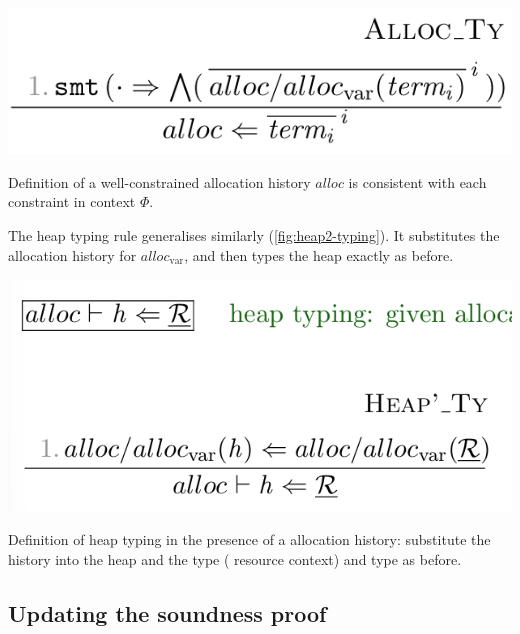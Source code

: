 \begin{marginfigure}
    \includegraphics{figures/alloc-typing}
    \caption{Definition of a well-constrained allocation history \textemdash{}
        $\mathit{alloc}$ is consistent with each constraint in context
        $\Phi$.}\label{fig:alloc-typing}
\end{marginfigure}

The heap typing rule generalises similarly (\cref{fig:heap2-typing}). It
substitutes the allocation history for $\mathit{alloc}_\mathrm{var}$, and then
types the heap exactly as before.

\begin{marginfigure}
    \includegraphics{figures/heap2-typing}
    \caption{Definition of heap typing in the presence of a allocation history:
        substitute the history into the heap and the type (
        resource context) and type as before.}\label{fig:heap2-typing}
\end{marginfigure}

\subsection{Updating the soundness proof}

